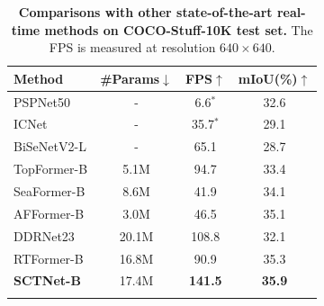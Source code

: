 \documentclass[letterpaper]{article} %
\begin{document}
\begin{table}[t]

  \centering
  \begin{tabular}{l|c|c|c}
    \Xhline{1pt}
    Method & \#Params$\downarrow$ &FPS$\uparrow$ &mIoU(\%)$\uparrow$\\
    \hline
    PSPNet50    &-   &6.6$^*$       &32.6\\
    ICNet       &-  &35.7$^*$ &29.1 \\
    BiSeNetV2-L &-   &65.1       &28.7 \\
    TopFormer-B   &5.1M  &94.7       &33.4 \\
    SeaFormer-B &8.6M   &41.9       &34.1 \\
    AFFormer-B &3.0M  &46.5   &35.1 \\
    DDRNet23    &20.1M  &108.8     &32.1\\
    RTFormer-B  &16.8M  &90.9       &35.3 \\
    \hline
    \textbf{SCTNet-B} &17.4M &\textbf{141.5}  &\textbf{35.9}  \\
    \Xhline{1pt}
  \end{tabular}
  \caption{\textbf{Comparisons with other state-of-the-art real-time methods on COCO-Stuff-10K test set.} The FPS is measured at resolution $640\times640$. }
  \label{sample-COCO-Stuff}
  \vspace{-5pt}
\end{table}
\end{document}
